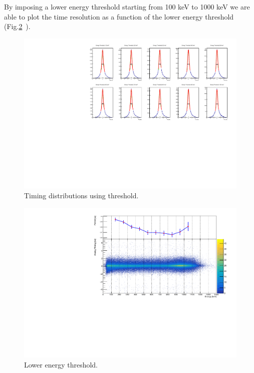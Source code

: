 \documentclass[a4paper,11pt]{article}
\begin{document}
\smallskip

\noindent By imposing a lower energy threshold starting from 100 keV to 1000 keV we are able to plot the time resolution as a function of the lower energy threshold (Fig.\ref{Fig: lower energy thr}~).

\smallskip

\begin{figure}[h!]
\centering
\includegraphics[width = \textwidth]{ThresholdTAC_dists}
\caption{Timing distributions using threshold.}
\label{Fig: lower energy thr}
\end{figure}

\begin{figure}[h!]
\centering
\includegraphics[width = 1\textwidth]{ThresholdTAC_FWHMvs2Ddist}
\caption{Lower energy threshold.}
\label{Fig: lower energy thr}
\end{figure}
\end{document}
